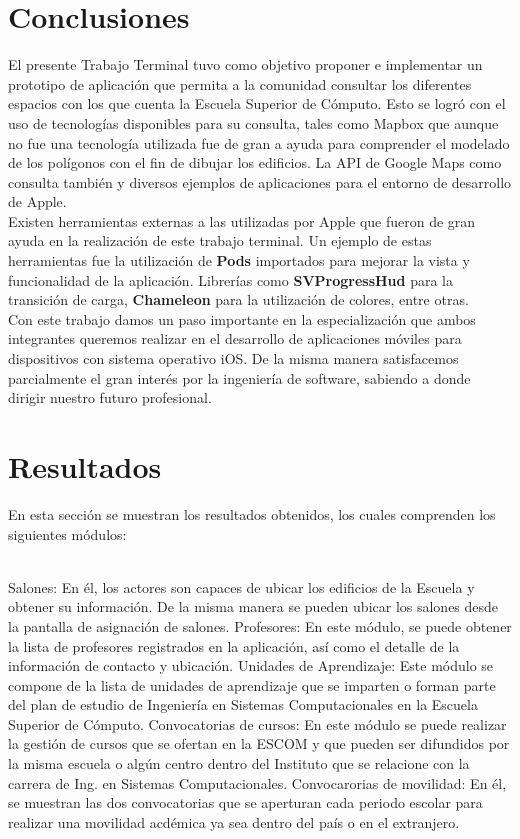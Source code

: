 \section{Conclusiones}

El presente Trabajo Terminal tuvo como objetivo proponer e implementar un prototipo de aplicación que permita a la comunidad consultar los diferentes espacios con los que cuenta la Escuela Superior de Cómputo. Esto se logró con el uso de tecnologías disponibles para su consulta, tales como Mapbox que aunque no fue una tecnología utilizada fue de gran a ayuda para comprender el modelado de los polígonos con el fin de dibujar los edificios. La API de Google Maps como consulta también y diversos ejemplos de aplicaciones para el entorno de desarrollo de Apple.\\

Existen herramientas externas a las utilizadas por Apple que fueron de gran ayuda en la realización de este trabajo terminal. Un ejemplo de estas herramientas fue la utilización de \textbf{Pods} importados para mejorar la vista y funcionalidad de la aplicación. Librerías como \textbf{SVProgressHud} para la transición de carga, \textbf{Chameleon} para la utilización de colores, entre otras. \\

Con este trabajo damos un paso importante en la especialización que ambos integrantes queremos realizar en el desarrollo de aplicaciones móviles para dispositivos con sistema operativo iOS. De la misma manera satisfacemos parcialmente el gran interés por la ingeniería de software, sabiendo a donde dirigir nuestro futuro profesional.

\section{Resultados}

En esta sección se muestran los resultados obtenidos, los cuales comprenden los siguientes módulos:\\ \\

\begin{UClist} 
	\UCli Salones: En él, los actores son capaces de ubicar los edificios de la Escuela y obtener su información. De la misma manera se pueden ubicar los salones desde la pantalla de asignación de salones.
	\UCli Profesores: En este módulo, se puede obtener la lista de profesores registrados en la aplicación, así como el detalle de la información de contacto y ubicación.
	\UCli Unidades de Aprendizaje: Este módulo se compone de la lista de unidades de aprendizaje que se imparten o forman parte del plan de estudio de Ingeniería en Sistemas Computacionales en la Escuela Superior de Cómputo.
	\UCli Convocatorias de cursos: En este módulo se puede realizar la gestión de cursos que se ofertan en la ESCOM y que pueden ser difundidos por la misma escuela o algún centro dentro del Instituto que se relacione con la carrera de Ing. en Sistemas Computacionales.
	\UCli Convocarorias de movilidad:  En él, se muestran las dos convocatorias que se aperturan cada periodo escolar para realizar una movilidad acdémica ya sea dentro del país o en el extranjero.
\end{UClist} 

